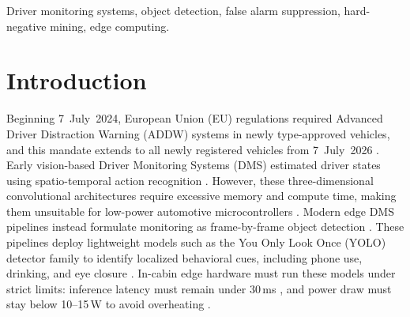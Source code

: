 \documentclass[conference]{IEEEtran}
\begin{document}
\begin{IEEEkeywords}
Driver monitoring systems, object detection, false alarm suppression, hard-negative mining, edge computing.
\end{IEEEkeywords}  

\section{Introduction}
Beginning 7~July~2024, European Union (EU) regulations required Advanced Driver Distraction Warning (ADDW) systems in newly type-approved vehicles, and this mandate extends to all newly registered vehicles from 7~July~2026 \cite{ec2026safercars}. 
Early vision-based Driver Monitoring Systems (DMS) estimated driver states using spatio-temporal action recognition \cite{ortega2020dmd, canas2021detection}. 
However, these three-dimensional convolutional architectures require excessive memory and compute time, making them unsuitable for low-power automotive microcontrollers \cite{canas2021detection, florez2024real}. 
Modern edge DMS pipelines instead formulate monitoring as frame-by-frame object detection \cite{yolodrive2025, pyolov82024}. 
These pipelines deploy lightweight models such as the You Only Look Once (YOLO) detector family to identify localized behavioral cues, including phone use, drinking, and eye closure \cite{ortega2020dmd, yolov12dms2025}. 
In-cabin edge hardware must run these models under strict limits: inference latency must remain under 30\,ms \cite{liu2019edge}, and power draw must stay below 10--15\,W to avoid overheating \cite{florez2024real, benoitcattin2020thermal}. 
\end{document}
